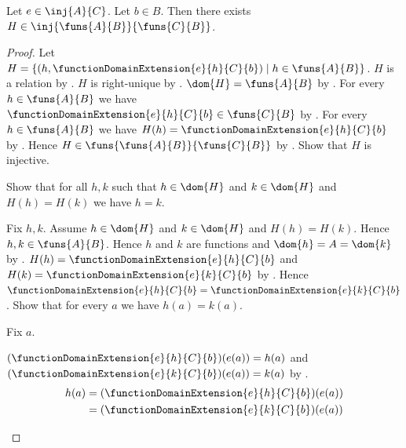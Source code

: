 \begin{theorem}\label{function_space_domain_injection_with_default}
    Let $e\in\inj{A}{C}$.
    Let $b\in B$.
    Then there exists $H\in\inj{\funs{A}{B}}{\funs{C}{B}}$.
\end{theorem}
\begin{proof}
    Let $H=\{(h,\functionDomainExtension{e}{h}{C}{b})
        \mid h\in\funs{A}{B}\}$.
    $H$ is a relation by .
    $H$ is right-unique by .
    $\dom{H}=\funs{A}{B}$ by .
    For every $h\in\funs{A}{B}$ we have
        $\functionDomainExtension{e}{h}{C}{b}\in\funs{C}{B}$
        by .
    For every $h\in\funs{A}{B}$ we have
        $H(h)=\functionDomainExtension{e}{h}{C}{b}$
        by .
    Hence $H\in\funs{\funs{A}{B}}{\funs{C}{B}}$
        by .
    Show that $H$ is injective.
    \begin{subproof}
        Show that for all $h,k$ such that $h\in\dom{H}$ and
            $k\in\dom{H}$ and $H(h)=H(k)$ we have $h=k$.
        \begin{subproof}
            Fix $h,k$.
            Assume $h\in\dom{H}$ and $k\in\dom{H}$ and $H(h)=H(k)$.
            Hence $h,k\in\funs{A}{B}$.
            Hence $h$ and $k$ are functions and $\dom{h}=A=\dom{k}$
                by .
            $H(h)=\functionDomainExtension{e}{h}{C}{b}$ and
                $H(k)=\functionDomainExtension{e}{k}{C}{b}$
                by .
            Hence $\functionDomainExtension{e}{h}{C}{b}
                =\functionDomainExtension{e}{k}{C}{b}$.
            Show that for every $a$ we have $h(a)=k(a)$.
            \begin{subproof}
                Fix $a$.
                \begin{byCase}
                        $(\functionDomainExtension{e}{h}{C}{b})(e(a))
                            =h(a)$ and
                            $(\functionDomainExtension{e}{k}{C}{b})(e(a))
                            =k(a)$
                            by .
                        \begin{align*}
                            h(a)
                                &= (\functionDomainExtension{e}{h}{C}{b})(e(a))
                                \\
                                &= (\functionDomainExtension{e}{k}{C}{b})(e(a))

\end{align*}
\end{byCase}
\end{subproof}
\end{subproof}
\end{subproof}
\end{proof}
